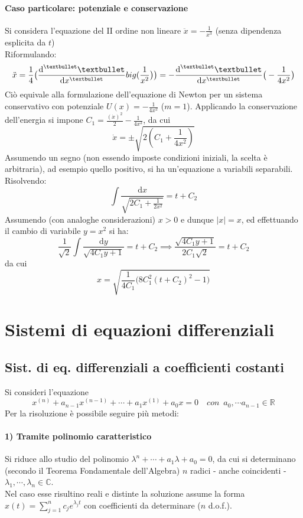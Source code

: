 \documentclass[10pt]{article}
\theoremstyle{plain}
\begin{document}
\paragraph{Caso particolare: potenziale e conservazione}
Si considera l'equazione del II ordine non lineare $\displaystyle \ddot x = - \frac{1}{x^3}$ (senza dipendenza esplicita da $t$)
\\Riformulando:
\[\ddot x = \frac{1}{4}\big(\frac{\textrm{d}^{•} •}{\textrm{d}x^{•}}\\big(\frac{1}{x^2}\big)\big)= -\frac{\textrm{d}^{•} •}{\textrm{d}x^{•}}\big(-\frac{1}{4x^2}\big)\]
Ciò equivale alla formulazione dell'equazione di Newton per un sistema conservativo con potenziale $\displaystyle U(x) = - \frac{1}{4x^2}$ ($m=1$). Applicando la conservazione dell'energia si impone $\displaystyle C_1 = \frac{(\dot x)^2}{2} - \frac{1}{4x^2}$, da cui
\[\dot x = \pm \sqrt{2(C_1 + \frac{1}{4x^2})}\]
Assumendo un segno (non essendo imposte condizioni iniziali, la scelta è arbitraria), ad esempio quello positivo, si ha un'equazione a variabili separabili. Risolvendo:
\[\int \frac{\textrm{d}x}{\sqrt{2C_1 + \frac{1}{2x^2}}} = t + C_2\]
Assumendo (con analoghe considerazioni) $x>0$ e dunque $|x| = x$, ed effettuando il cambio di variabile $y = x^2$ si ha:
\[\frac{1}{\sqrt{2}}\int \frac{\textrm{d}y}{\sqrt{4C_1y + 1}} = t + C_2 \implies \frac{\sqrt{4C_1 y + 1}}{2C_1 \sqrt{2}} = t + C_2\]
da cui 
\[x = \sqrt{\frac{1}{4C_1} \big(8C_1^2 (t + C_2)^2 - 1\big)}\]

\section{Sistemi di equazioni differenziali}
\subsection{Sist. di eq. differenziali a coefficienti costanti}
Si consideri l'equazione
\[x^{(n)} + a_{n-1}x^{(n-1)} + \cdots + a_1x^{(1)} + a_0 x = 0 \quad con \enspace a_0, \cdots a_{n-1} \in \mathbb{R}\]
Per la risoluzione è possibile seguire più metodi:

\paragraph{1) Tramite polinomio caratteristico}
Si riduce allo studio del polinomio $\lambda^n + \cdots + a_1\lambda + a_0 = 0$, da cui si determinano (secondo il Teorema Fondamentale dell'Algebra) $n$ radici - anche coincidenti - $\lambda_1, \cdots, \lambda_n \in \mathbb{C}$.
\\Nel caso esse risultino reali e distinte la soluzione assume la forma $\displaystyle x(t) = \sum\limits_{j=1}^n c_j e^{\lambda_j t}$ con coefficienti da determinare ($n$ d.o.f.).
\end{document}
